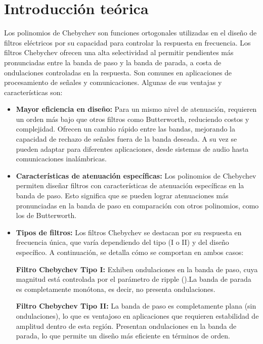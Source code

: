 \newpage
\section{Introducción teórica}
Los polinomios de Chebychev son funciones ortogonales utilizadas en el diseño de filtros eléctricos por su capacidad para controlar la respuesta en frecuencia. Los filtros Chebychev ofrecen una alta selectividad al permitir pendientes más pronunciadas entre la banda de paso y la banda de parada, a costa de ondulaciones controladas en la respuesta. Son comunes en aplicaciones de procesamiento de señales y comunicaciones. Algunas de sus ventajas y características son:

\begin{itemize}
    \item \textbf{Mayor eficiencia en diseño:} Para un mismo nivel de atenuación, requieren un orden más bajo que otros filtros como Butterworth, reduciendo costos y complejidad. Ofrecen un cambio rápido entre las bandas, mejorando la capacidad de rechazo de señales fuera de la banda deseada. A su vez se pueden adaptar para diferentes aplicaciones, desde sistemas de audio hasta comunicaciones inalámbricas.
	\item \textbf{Características de atenuación específicas:} Los polinomios de Chebychev permiten diseñar filtros con características de atenuación específicas en la banda de paso. Esto significa que se pueden lograr atenuaciones más pronunciadas en la banda de paso en comparación con otros polinomios, como los de Butterworth.

    \item \textbf{Tipos de filtros:} Los filtros Chebychev se destacan por su respuesta en frecuencia única, que varía dependiendo del tipo (I o II) y del diseño específico. A continuación, se detalla cómo se comportan en ambos casos:
    
    \textbf{Filtro Chebychev Tipo I:}  Exhiben ondulaciones en la banda de paso, cuya magnitud está controlada por el parámetro de ripple ().La banda de parada es completamente monótona, es decir, no presenta ondulaciones.
    
    \textbf{Filtro Chebychev Tipo II:} La banda de paso es completamente plana (sin ondulaciones), lo que es ventajoso en aplicaciones que requieren estabilidad de amplitud dentro de esta región. Presentan ondulaciones en la banda de parada, lo que permite un diseño más eficiente en términos de orden.

	
\end{itemize}